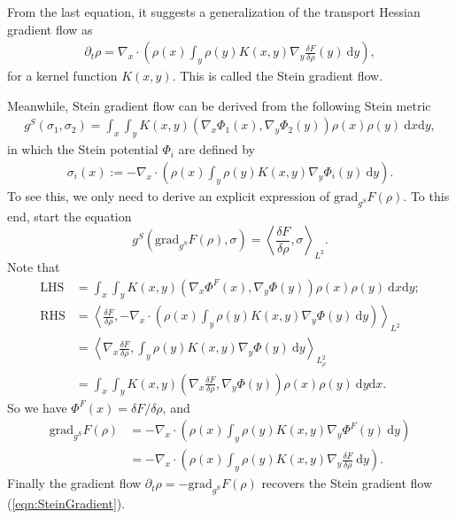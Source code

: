 \documentclass[11pt]{book}
\begin{document}
From the last equation, it suggests a generalization of the transport Hessian gradient flow as
\begin{align}\label{eqn:SteinGradient}
\partial_t \rho = \nabla_x \cdot \left( \rho(x) \int_y \rho(y) K(x,y) \nabla_y \frac{\delta F}{\delta \rho}(y) \ \text{d}y \right),
\end{align}
for a kernel function $K(x,y)$. This is called the Stein gradient flow.

Meanwhile, Stein gradient flow can be derived from the following Stein metric
\begin{align}\label{eqn:SteinMetric}
g^S(\sigma_1,\sigma_2) = \int_x \int_y K(x,y)(\nabla_x\Phi_1(x),\nabla_y\Phi_2(y))\rho(x)\rho(y)\ \text{d}x\text{d}y,
\end{align}
in which the Stein potential $\Phi_i$ are defined by
\begin{align}\label{eqn:SteinPotential}
\sigma_i(x) := -\nabla_x\cdot\left( \rho(x) \int_y \rho(y)K(x,y) \nabla_y \Phi_i(y)\ \text{d}y \right).
\end{align}
To see this, we only need to derive an explicit expression of $\text{grad}_{g^S}F(\rho)$. To this end, start the equation
\[
g^S(\text{grad}_{g^S}F(\rho), \sigma) = \left\langle \frac{\delta F}{\delta \rho}, \sigma \right\rangle_{L^2}.
\]
Note that 
\begin{align*}
\text{LHS} &= \int_x \int_y K(x,y)(\nabla_x\Phi^F(x),\nabla_y\Phi(y))\rho(x)\rho(y)\ \text{d}x\text{d}y; \\
\text{RHS} & = \left\langle  \frac{\delta F}{\delta \rho}, -\nabla_x\cdot\left( \rho(x) \int_y \rho(y)K(x,y) \nabla_y \Phi(y)\ \text{d}y \right) \right\rangle_{L^2} \\
& = \left\langle  \nabla_x \frac{\delta F}{\delta \rho}, \int_y \rho(y)K(x,y) \nabla_y \Phi(y)\ \text{d}y \right\rangle_{L_{\rho}^2} \\
& = \int_x \int_y K(x,y)\left(\nabla_x\frac{\delta F}{\delta \rho}, \nabla_y \Phi(y)\right) \rho(x)\rho(y) \ \text{d}y\text{d}x.
\end{align*}
So we have $\Phi^F(x) = \delta F/\delta\rho$, and 
\begin{align*}
\text{grad}_{g^S}F(\rho) &= -\nabla_x\cdot\left( \rho(x) \int_y \rho(y)K(x,y) \nabla_y \Phi^F(y)\ \text{d}y \right) \\
&= -\nabla_x\cdot\left( \rho(x) \int_y \rho(y)K(x,y) \nabla_y \frac{\delta F}{\delta\rho} \ \text{d}y \right).
\end{align*}
Finally the gradient flow $\partial_t\rho = -\text{grad}_{g^S}F(\rho)$ recovers the Stein gradient flow (\ref{eqn:SteinGradient}).
\end{document}
